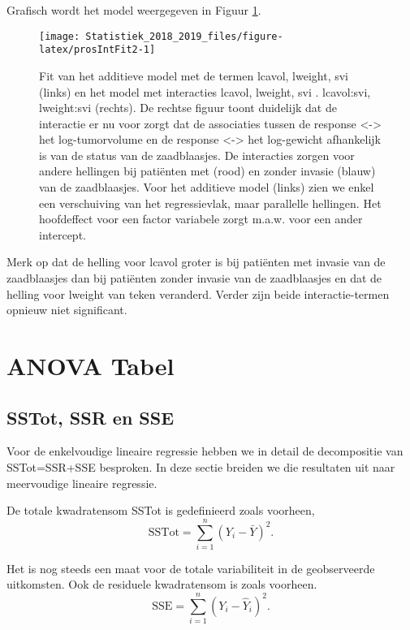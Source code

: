\documentclass[12pt,dutch,coursenotes]{book}
\theoremstyle{definition}
\theoremstyle{definition}
\theoremstyle{definition}
\theoremstyle{remark}
\begin{document}
Grafisch wordt het model weergegeven in Figuur \ref{fig:prosIntFit2}.

\begin{figure}

{\centering \texttt{[image: Statistiek\_2018\_2019\_files/figure-latex/prosIntFit2-1]} 

}

\caption{Fit van het additieve model met de termen lcavol, lweight, svi (links) en het model met interacties lcavol, lweight, svi . lcavol:svi, lweight:svi (rechts). De rechtse figuur toont duidelijk dat de interactie er nu voor zorgt dat de associaties tussen de response <-> het log-tumorvolume en de response <-> het log-gewicht afhankelijk is van de status van de zaadblaasjes. De interacties zorgen voor andere hellingen bij patiënten met (rood) en zonder invasie (blauw) van de zaadblaasjes. Voor het additieve model (links) zien we enkel een verschuiving van het regressievlak, maar parallelle hellingen. Het hoofdeffect voor een factor variabele zorgt m.a.w. voor een ander intercept.}\label{fig:prosIntFit2}
\end{figure}

Merk op dat de helling voor lcavol groter is bij patiënten met invasie
van de zaadblaasjes dan bij patiënten zonder invasie van de zaadblaasjes
en dat de helling voor lweight van teken veranderd. Verder zijn beide
interactie-termen opnieuw niet significant.

\section{ANOVA Tabel}\label{anova-tabel-2}

\subsection{SSTot, SSR en SSE}\label{sstot-ssr-en-sse}

Voor de enkelvoudige lineaire regressie hebben we in detail de
decompositie van SSTot=SSR+SSE besproken. In deze sectie breiden we die
resultaten uit naar meervoudige lineaire regressie.

De totale kwadratensom SSTot is gedefinieerd zoals voorheen, \[
  \text{SSTot} = \sum_{i=1}^n (Y_i - \bar{Y})^2.
\]

Het is nog steeds een maat voor de totale variabiliteit in de
geobserveerde uitkomsten. Ook de residuele kwadratensom is zoals
voorheen. \[
  \text{SSE} = \sum_{i=1}^n (Y_i-\hat{Y}_i)^2.
\]
\end{document}
